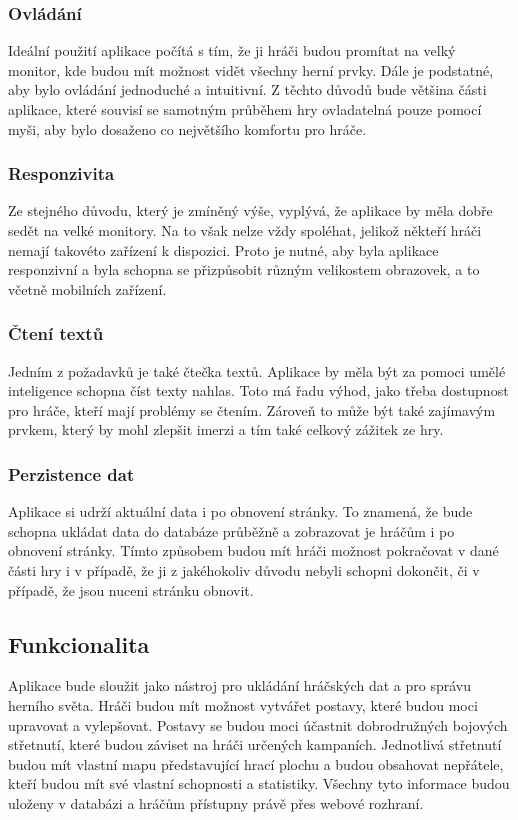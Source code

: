 \subsubsection*{Ovládání}
Ideální použití aplikace počítá s tím, že ji hráči budou promítat na velký monitor, kde budou mít možnost vidět všechny herní prvky. Dále je podstatné, aby bylo ovládání jednoduché a intuitivní. Z těchto důvodů bude většina části aplikace, které souvisí se samotným průběhem hry ovladatelná pouze pomocí myši, aby bylo dosaženo co největšího komfortu pro hráče.

\subsubsection*{Responzivita}
Ze stejného důvodu, který je zmíněný výše, vyplývá, že aplikace by měla dobře sedět na velké monitory. Na to však nelze vždy spoléhat, jelikož někteří hráči nemají takovéto zařízení k dispozici. Proto je nutné, aby byla aplikace responzivní a byla schopna se přizpůsobit různým velikostem obrazovek, a to včetně mobilních zařízení.

\subsubsection*{Čtení textů}
Jedním z požadavků je také čtečka textů. Aplikace by měla být za pomoci umělé inteligence schopna číst texty nahlas. Toto má řadu výhod, jako třeba dostupnost pro hráče, kteří mají problémy se čtením. Zároveň to může být také zajímavým prvkem, který by mohl zlepšit imerzi a tím také celkový zážitek ze hry.

\subsubsection*{Perzistence dat}
Aplikace si udrží aktuální data i po obnovení stránky. To znamená, že bude schopna ukládat data do databáze průběžně a zobrazovat je hráčům i po obnovení stránky. Tímto způsobem budou mít hráči možnost pokračovat v dané části hry i v případě, že ji z jakéhokoliv důvodu nebyli schopni dokončit, či v případě, že jsou nuceni stránku obnovit.

\subsection{Funkcionalita}
Aplikace bude sloužit jako nástroj pro ukládání hráčských dat a pro správu herního světa. Hráči budou mít možnost vytvářet postavy, které budou moci upravovat a vylepšovat. Postavy se budou moci účastnit dobrodružných bojových střetnutí, které budou záviset na hráči určených kampaních. Jednotlivá střetnutí budou mít vlastní mapu představující hrací plochu a budou obsahovat nepřátele, kteří budou mít své vlastní schopnosti a statistiky. Všechny tyto informace budou uloženy v databázi a hráčům přístupny právě přes webové rozhraní.

